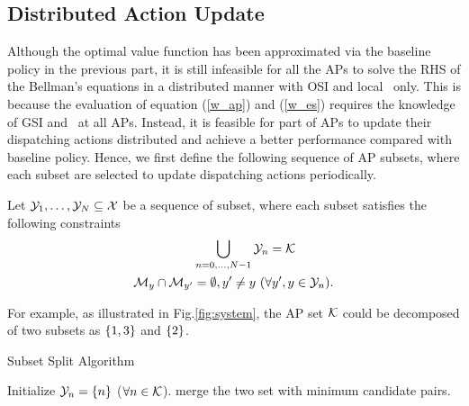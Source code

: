 \subsection{Distributed Action Update}
\label{subsec:ap_alg}
Although the optimal value function has been approximated via the baseline policy in the previous part, it is still infeasible for all the APs to solve the RHS of the Bellman's equations in a distributed manner with OSI and local \brlatency~only.
This is because the evaluation of equation (\ref{w_ap}) and (\ref{w_es}) requires the knowledge of GSI and \brlatency~at all APs.
Instead, it is feasible for part of APs to update their dispatching actions distributed and achieve a better performance compared with baseline policy.
Hence, we first define the following sequence of AP subsets, where each subset are selected to update dispatching actions periodically.
\begin{definition}
    Let $\mathcal{Y}_{1}, \dots, \mathcal{Y}_{N} \subseteq \mathcal{X}$ be a sequence of subset, where each subset satisfies the following constraints
    \begin{align}
        &\bigcup_{n=0,\dots,N-1} \mathcal{Y}_{n} = \mathcal{K}
        \\
        \mathcal{M}_{y} \cap \mathcal{M}_{y'} &=\emptyset, y' \neq y~(\forall y',y \in \mathcal{Y}_{n}).
    \end{align}
\end{definition}
For example, as illustrated in Fig.\ref{fig:system}, the AP set $\mathcal{K}$ could be decomposed of two subsets as $\{1,3\}$ and $\{2\}$.
\begin{algorithm}[ht]
    \caption{Subset Split Algorithm}\label{alg_0}
    \DontPrintSemicolon %
    Initialize $\mathcal{Y}_{n} = \{n\}$ ($\forall n\in\mathcal{K}$).\;
    {
        merge the two set with minimum candidate pairs.\;
    }
\end{algorithm}

